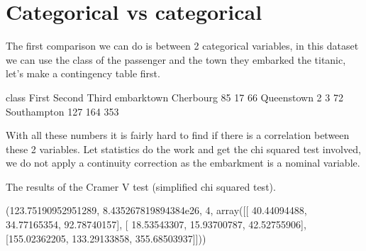 \documentclass[letterpaper,10pt,english]{jupyterBook}
\begin{document}
\section{Categorical vs categorical}
\label{\detokenize{c5_data_exploration/bivariate_analysis:categorical-vs-categorical}}
\sphinxAtStartPar
The first comparison we can do is between 2 categorical variables, in this dataset we can use the class of the passenger and the town they embarked the titanic, let’s make a contingency table first.

\begin{sphinxVerbatim}[commandchars=\\\{\}]
  \PYG{p}{[}\PYG{p}{]} \PYG{p}{[}\PYG{p}{]}
\end{sphinxVerbatim}

\begin{sphinxVerbatim}[commandchars=\\\{\}]
class        First  Second  Third
embark\PYGZus{}town                      
Cherbourg       85      17     66
Queenstown       2       3     72
Southampton    127     164    353
\end{sphinxVerbatim}

\sphinxAtStartPar
With all these numbers it is fairly hard to find if there is a correlation between these 2 variables. Let statistics do the work and get the chi squared test involved, we do not apply a continuity correction as the embarkment is a nominal variable.

\sphinxAtStartPar
The results of the Cramer V test (simplified chi squared test).

\begin{sphinxVerbatim}[commandchars=\\\{\}]
      
   
\end{sphinxVerbatim}

\begin{sphinxVerbatim}[commandchars=\\\{\}]
(123.75190952951289,
 8.435267819894384e\PYGZhy{}26,
 4,
 array([[ 40.44094488,  34.77165354,  92.78740157],
        [ 18.53543307,  15.93700787,  42.52755906],
        [155.02362205, 133.29133858, 355.68503937]]))
\end{sphinxVerbatim}
\end{document}

